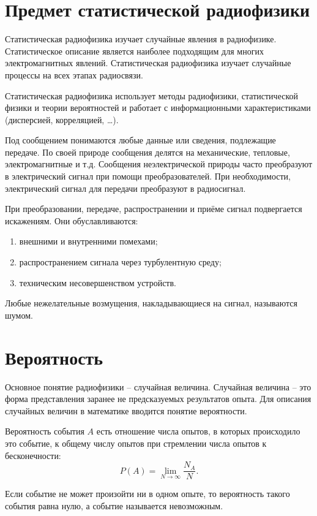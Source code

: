 \section{Предмет статистической радиофизики}

Статистическая радиофизика изучает случайные явления в радиофизике.
Статистическое описание является наиболее подходящим для многих электромагнитных
явлений. Статистическая радиофизика изучает случайные процессы на всех этапах
радиосвязи.

Статистическая радиофизика использует методы радиофизики, статистической физики
и теории вероятностей и работает с информационными характеристиками (дисперсией,
корреляцией, \ldots).

Под сообщением понимаются любые данные или сведения, подлежащие передаче. По
своей природе сообщения делятся на механические, тепловые, электромагнитные и
т.д. Сообщения неэлектрической природы часто преобразуют в электрический сигнал
при помощи преобразователей. При необходимости, электрический сигнал для
передачи преобразуют в радиосигнал.

При преобразовании, передаче, распространении и приёме сигнал подвергается
искажениям. Они обуславливаются:
\begin{enumerate}
    \item внешними и внутренними помехами;
    \item распространением сигнала через турбулентную среду;
    \item техническим несовершенством устройств.
\end{enumerate}
Любые нежелательные возмущения, накладывающиеся на сигнал, называются шумом.

\section{Вероятность}

Основное понятие радиофизики -- случайная величина. Случайная величина -- это
форма представления заранее не предсказуемых результатов опыта. Для описания
случайных величин в математике вводится понятие вероятности.

Вероятность события \( A \) есть отношение числа опытов, в которых происходило
это событие, к общему числу опытов при стремлении числа опытов к бесконечности:
\[
    P(A) = \lim_{N\to\infty}\frac{N_A}{N}.
\]

Если событие не может произойти ни в одном опыте, то вероятность такого события
равна нулю, а событие называется невозможным.

